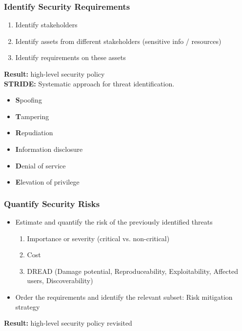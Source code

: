 \subsubsection{Identify Security Requirements}
\begin{enumerate}
    \item Identify stakeholders
    \item Identify assets from different stakeholders (sensitive info / resources)
    \item Identify requirements on these assets
\end{enumerate}
\textbf{Result:} high-level security policy\\
\textbf{STRIDE:} Systematic approach for threat identification.
\begin{itemize}
    \item \textbf{S}poofing
    \item \textbf{T}ampering
    \item \textbf{R}epudiation
    \item \textbf{I}nformation disclosure
    \item \textbf{D}enial of service
    \item \textbf{E}levation of privilege
\end{itemize}

\subsubsection{Quantify Security Risks}
\begin{itemize}
    \item Estimate and quantify the risk of the previously identified threats
    \begin{enumerate}
        \item Importance or severity (critical vs. non-critical)
        \item Cost
        \item DREAD (Damage potential, Reproduceability, Exploitability, Affected users, Discoverability)
    \end{enumerate}
    \item Order the requirements and identify the relevant subset: Risk mitigation strategy
\end{itemize}
\textbf{Result:} high-level security policy revisited

